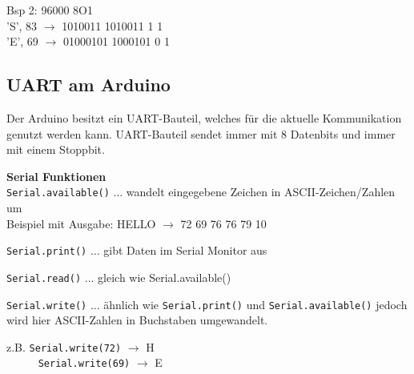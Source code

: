Bsp 2: 96000 8O1 \\
'S', 83 $\rightarrow$ 1010011  1010011 1 1 \\
'E', 69 $\rightarrow$ 01000101  1000101 0 1

\subsection*{UART am Arduino}
Der Arduino besitzt ein UART-Bauteil, welches für die aktuelle Kommunikation genutzt werden kann. UART-Bauteil sendet immer mit 8 Datenbits und immer mit einem Stoppbit.

\textbf{Serial Funktionen} \\
\texttt{Serial.available()} ... wandelt eingegebene Zeichen in ASCII-Zeichen/Zahlen um \\
Beispiel mit Ausgabe: HELLO $\rightarrow$ 72 69 76 76 79 10

\texttt{Serial.print()} ... gibt Daten im Serial Monitor aus


\texttt{Serial.read()} ... gleich wie Serial.available()

\texttt{Serial.write()} ... ähnlich wie \texttt{Serial.print()} und \texttt{Serial.available()} jedoch wird hier ASCII-Zahlen in Buchstaben umgewandelt.
\begin{tabbing}
	z.B. \= \texttt{Serial.write(72)} $\rightarrow$ H \\
	~~~~~ \= \texttt{Serial.write(69)} $\rightarrow$ E \\
\end{tabbing}

